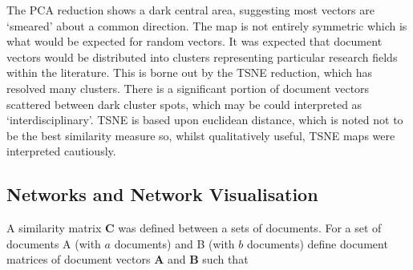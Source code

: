 The PCA reduction shows a dark central area, suggesting most vectors are `smeared' about a common direction. The map is not entirely symmetric which is what would be expected for random vectors. It was expected that document vectors would be distributed into clusters representing particular research fields within the literature. This is borne out by the TSNE reduction, which has resolved many clusters. There is a significant portion of document vectors scattered between dark cluster spots, which may be could interpreted as `interdisciplinary'.
TSNE is based upon euclidean distance, which is noted not to be the best similarity measure so, whilst qualitatively useful, TSNE maps were interpreted cautiously.
\subsection{Networks and Network Visualisation}
\label{sec:COSINEMAT}
A similarity matrix $\mathbf{C}$ was defined between a sets of documents. For a set of documents  A (with $a$ documents) and B (with $b$ documents) define document matrices of document vectors $\mathbf{A}$ and $\mathbf{B}$ such that 

